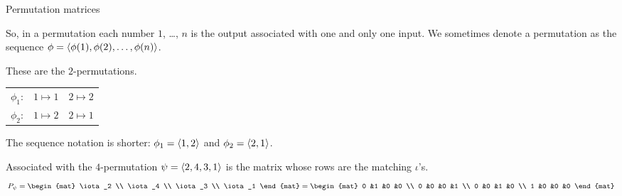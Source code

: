 \documentclass[10pt,t]{beamer}
\begin{document}
\begin{frame}{Permutation matrices}

\pause
\df[df:permutation]

So, in a permutation each number 
$1$, \ldots, $n$ is the output associated with one and only one input.
We sometimes denote a permutation as the sequence 
$\phi=\langle\phi(1),\phi(2),\ldots,\phi(n)\rangle$.

\ex[ex:AllTwoThreePerms]
These are the $2$-permutations.
\begin{center}
  \begin{tabular}{rcc}
    $\phi_1$:  &$1\mapsto 1$  &$2\mapsto 2$  \\
    $\phi_2$:  &$1\mapsto 2$  &$2\mapsto 1$      
  \end{tabular}
\end{center}
The sequence notation is shorter:
\( \phi_1=\langle1,2\rangle \) and \( \phi_2=\langle2,1\rangle \).
\ex[ex:AllThreePerms]
\end{frame}
\begin{frame}

\ex
Associated with the $4$-permutation $\psi=\langle2,4,3,1\rangle$ is the
matrix whose rows are the matching $\iota$'s.
\begin{equation*}
  P_{\psi}
  =
  \begin{mat}
    \iota_2 \\
    \iota_4 \\
    \iota_3 \\
    \iota_1
  \end{mat}
  =
  \begin{mat}
    0 &1 &0 &0 \\
    0 &0 &0 &1 \\
    0 &0 &1 &0 \\
    1 &0 &0 &0
  \end{mat}
\end{equation*}
\end{frame}
\end{document}

